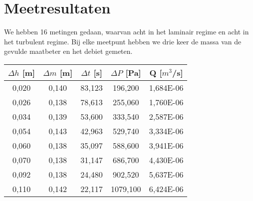 \section{Meetresultaten}

We hebben 16 metingen gedaan, waarvan acht in het laminair regime en 
acht in het turbulent regime. Bij elke meetpunt hebben we drie keer de massa 
van de gevulde maatbeter en het debiet gemeten.\\
\begin{center}
    
    \begin{tabular}{| c | c | c | c | c |}
        \hline
        $\Delta h$ [m]  & $\Delta m$ [m]    & $\Delta t$ [s]    & $\Delta P$ [Pa]   & Q [$m^3$/s]      \\ \hline
        0,020           & 0,140             & 83,123            & 196,200           & 1,684E-06        \\ \hline
        0,026           & 0,138             & 78,613            & 255,060           & 1,760E-06         \\ \hline
        0,034           & 0,139             & 53,600            & 333,540           & 2,587E-06         \\ \hline
        0,054           & 0,143             & 42,963            & 529,740           & 3,334E-06         \\ \hline 
        0,060           & 0,138             & 35,097            & 588,600           & 3,941E-06         \\ \hline
        0,070           & 0,138             & 31,147            & 686,700           & 4,430E-06         \\ \hline
        0,092           & 0,138             & 24,480            & 902,520           & 5,637E-06         \\ \hline
        0,110           & 0,142             & 22,117            & 1079,100          & 6,424E-06         \\ \hline
    \end{tabular}
\end{center}

